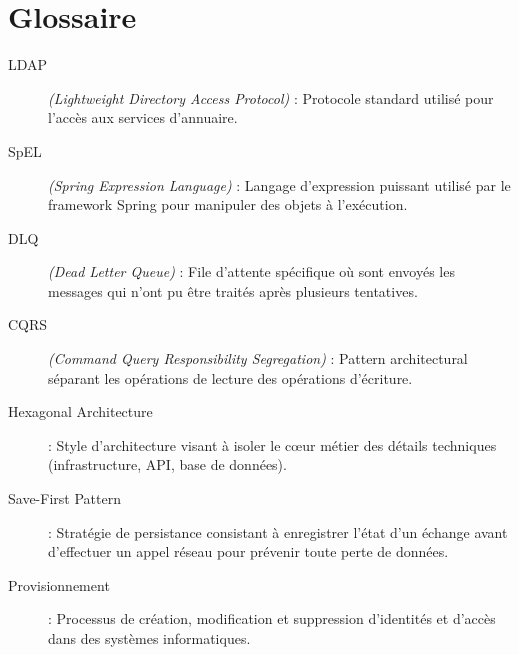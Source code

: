 \chapter*{Glossaire}
\begin{description}
    \item[LDAP] \textit{(Lightweight Directory Access Protocol)} : Protocole standard utilisé pour l'accès aux services d'annuaire.
    \item[SpEL] \textit{(Spring Expression Language)} : Langage d'expression puissant utilisé par le framework Spring pour manipuler des objets à l'exécution.
    \item[DLQ] \textit{(Dead Letter Queue)} : File d'attente spécifique où sont envoyés les messages qui n'ont pu être traités après plusieurs tentatives.
    \item[CQRS] \textit{(Command Query Responsibility Segregation)} : Pattern architectural séparant les opérations de lecture des opérations d'écriture.
    \item[Hexagonal Architecture] : Style d'architecture visant à isoler le cœur métier des détails techniques (infrastructure, API, base de données).
    \item[Save-First Pattern] : Stratégie de persistance consistant à enregistrer l'état d'un échange avant d'effectuer un appel réseau pour prévenir toute perte de données.
    \item[Provisionnement] : Processus de création, modification et suppression d'identités et d'accès dans des systèmes informatiques.
\end{description}
\newpage

\listoffigures
{}
\newpage

\listoftables
{}
\newpage

\tableofcontents
\newpage
